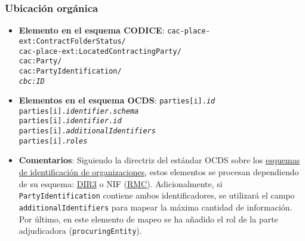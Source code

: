         \subsubsection{Ubicación orgánica} \label{subsec:UbicacionOrganica}
            \begin{itemize}
                \item \textbf{Elemento en el esquema CODICE}:
                    \tabto{7.6cm} \texttt{cac-place-ext:ContractFolderStatus/} \\
                    \tabto{7.6cm} \texttt{cac-place-ext:LocatedContractingParty/} \\
                    \tabto{7.6cm} \texttt{cac:Party/} \\
                    \tabto{7.6cm} \texttt{cac:PartyIdentification/} \\
                    \tabto{7.6cm} \texttt{\textit{cbc:ID}}
                \item \textbf{Elementos en el esquema OCDS}:
                    \tabto{7.6cm} \texttt{parties[i].\textit{id}} \\
                    \tabto{7.6cm} \texttt{parties[i].\textit{identifier.schema}} \\
                    \tabto{7.6cm} \texttt{parties[i].\textit{identifier.id}} \\
                    \tabto{7.6cm} \texttt{parties[i].\textit{additionalIdentifiers}} \\
                    \tabto{7.6cm} \texttt{parties[i].\textit{roles}}
                \item \textbf{Comentarios}: Siguiendo la directriz del estándar OCDS sobre los \href{https://standard.open-contracting.org/latest/es/schema/codelists/#organization-identifier-scheme}{esquemas de identificación de organizaciones}, estos elementos se procesan dependiendo de su esquema: \href{http://org-id.guide/list/ES-DIR3}{DIR3} o NIF (\href{http://org-id.guide/list/ES-RMC}{RMC}). Adicionalmente, si \texttt{PartyIdentification} contiene ambos identificadores, se utilizará el campo \texttt{additionalIdentifiers} para mapear la máxima cantidad de información. Por último, en este elemento de mapeo se ha añadido el rol de la parte adjudicadora (\texttt{procuringEntity}).
            \end{itemize}
        

